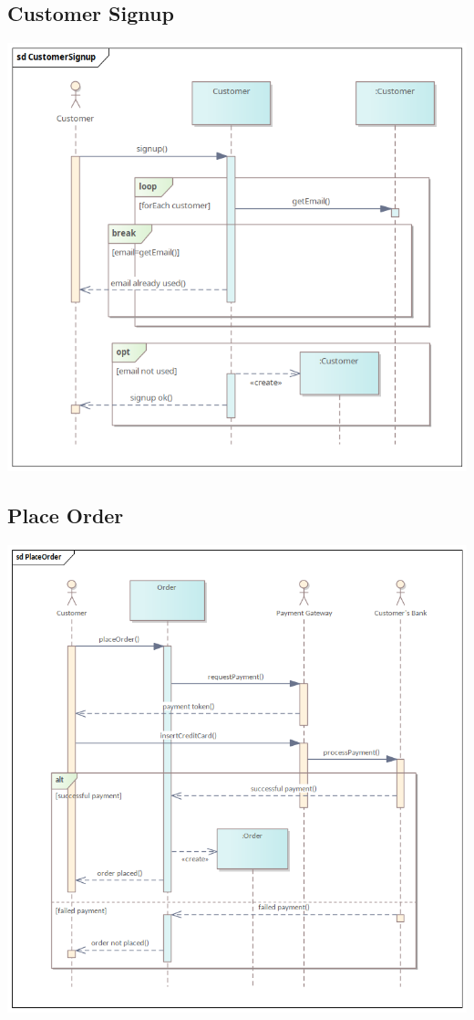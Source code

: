 \subsection{Customer Signup}
\begin{center}
  \includegraphics[width=\textwidth]{immagini/Analisi/SequenceDiagrams/CustomerSignup.png}
\end{center}

\subsection{Place Order}
\begin{center}
  \includegraphics[width=\textwidth]{immagini/Analisi/SequenceDiagrams/PlaceOrder.png}
\end{center}

